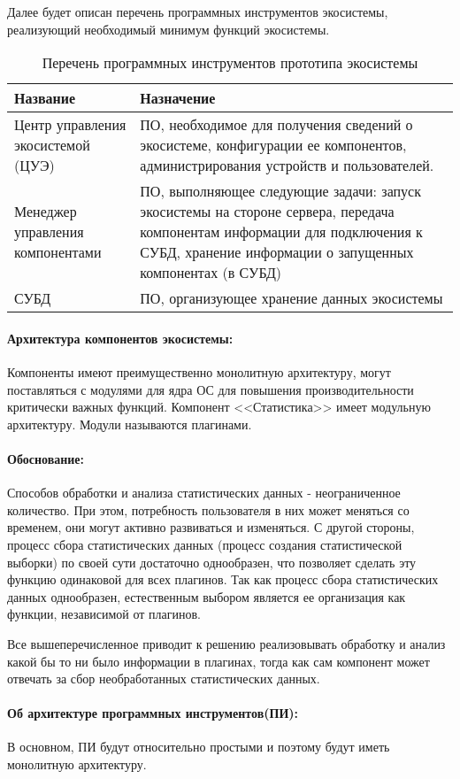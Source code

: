 Далее будет описан перечень программных инструментов экосистемы, реализующий необходимый минимум функций экосистемы.
\begin{table}[ht]
   \centering
   \begin{tabularx}{\textwidth}{|>{\centering}p{}|X|}
      \cline{1-2}
      Название & Назначение \\
      \hline
      Центр управления экосистемой (ЦУЭ) & ПО, необходимое для получения сведений о экосистеме, конфигурации ее компонентов, администрирования устройств и пользователей. \\
      \hline
      Менеджер управления компонентами & ПО, выполняющее следующие задачи:
      запуск экосистемы на стороне сервера, 
      передача компонентам информации для подключения к СУБД, 
      хранение информации о запущенных компонентах (в СУБД) \\
      \hline
      СУБД & ПО, организующее хранение данных экосистемы \\
      \hline
   \end{tabularx}
   \caption{Перечень программных инструментов прототипа экосистемы}
   \label{table-systools}
\end{table}

\paragraph{Архитектура компонентов экосистемы:} 
Компоненты имеют преимущественно монолитную архитектуру, могут поставляться с модулями для ядра ОС для повышения производительности критически важных функций.
Компонент <<Статистика>> имеет модульную архитектуру. Модули называются плагинами. 

\paragraph{Обоснование:} 
Способов обработки и анализа статистических данных - неограниченное количество. При этом, потребность пользователя в них может меняться со временем, они могут активно развиваться и изменяться.
С другой стороны, процесс сбора статистических данных (процесс создания статистической выборки) по своей сути достаточно однообразен, что позволяет сделать эту функцию одинаковой для всех плагинов. Так как процесс сбора статистических данных однообразен, естественным выбором является ее организация как функции, независимой от плагинов.

Все вышеперечисленное приводит к решению реализовывать обработку и анализ какой бы то ни было информации в плагинах, тогда как сам компонент может отвечать за сбор необработанных статистических данных.  

\paragraph{Об архитектуре программных инструментов(ПИ):}
В основном, ПИ будут относительно простыми и поэтому будут иметь монолитную архитектуру.
